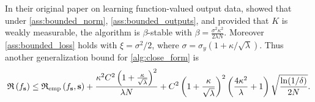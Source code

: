 In their original paper on learning function-valued output data,
\citet{kadri2015operator} showed that under \cref{ass:bounded_norm},
\cref{ass:bounded_outputs}, and provided that $K$ is weakly measurable, the
algorithm is $\beta$-stable with $\beta=\frac{\sigma^2\kappa^2}{2\lambda N}$.
Moreover \cref{ass:bounded_loss} holds with $\xi=\sigma^2 / 2$, where
$\sigma=\sigma_y(1 + \kappa/\sqrt{\lambda})$.  Thus another generalization bound
for \cref{alg:close_form} is
\begin{dmath}
    \risk{f_{\seq{s}}} \le \riskemp{f_{\seq{s}}, \seq{s}}  + \frac{\kappa^2 C^2
    \left(1 + \frac{\kappa}{\sqrt{\lambda}} \right)^2 }{\lambda N} + C^2\left(
    1 + \frac{\kappa}{\sqrt{\lambda}} \right)^2\left( \frac{4\kappa^2}{\lambda}
    + 1 \right)\sqrt{\frac{\ln(1/\delta)}{2N}}.
\end{dmath}

